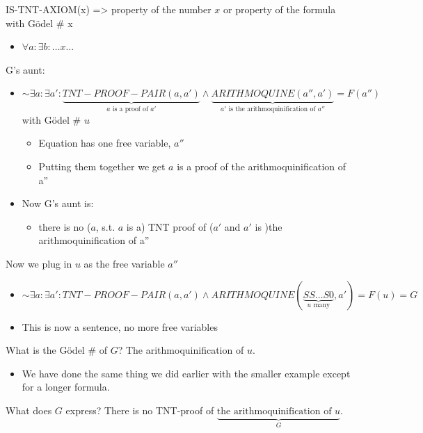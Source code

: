 \documentclass[11pt]{article}
\begin{document}
IS-TNT-AXIOM(x) => property of the number \(x\) or property of the formula with Gödel \# x
\begin{itemize}
\item \(\forall a : \exists b: \ldots x \ldots\)
\end{itemize}

G's aunt:
\begin{itemize}
\item \(\sim \exists a : \exists a': \underbrace{TNT-PROOF-PAIR(a,a')}_{a \text{ is a proof of }a'} \wedge \underbrace{ARITHMOQUINE(a'', a')}_{a' \text{ is the arithmoquinification of }a''} = F(a'')\) with Gödel \# \(u\)
\begin{itemize}
\item Equation has one free variable, \(a''\)
\item Putting them together we get \(a\) is a proof of the arithmoquinification of a''
\end{itemize}
\item Now G's aunt is:
\begin{itemize}
\item there is no (\(a\), s.t. \(a\) is a) TNT proof of (\(a'\) and \(a'\) is )the arithmoquinification of a''
\end{itemize}
\end{itemize}
Now we plug in \(u\) as the free variable \(a''\)
\begin{itemize}
\item \(\sim \exists a : \exists a': TNT-PROOF-PAIR(a,a') \wedge ARITHMOQUINE (\underbrace{SS\ldots S 0}_{u \text{ many}},a') = F(u) = G\)
\item This is now a sentence, no more free variables
\end{itemize}
What is the Gödel \# of \(G\)? The arithmoquinification of \(u\).
\begin{itemize}
\item We have done the same thing we did earlier with the smaller example except for a longer formula.
\end{itemize}
What does \(G\) express? There is no TNT-proof of \(\underbrace{\text{the arithmoquinification of }u}_{G}\).
\end{document}
